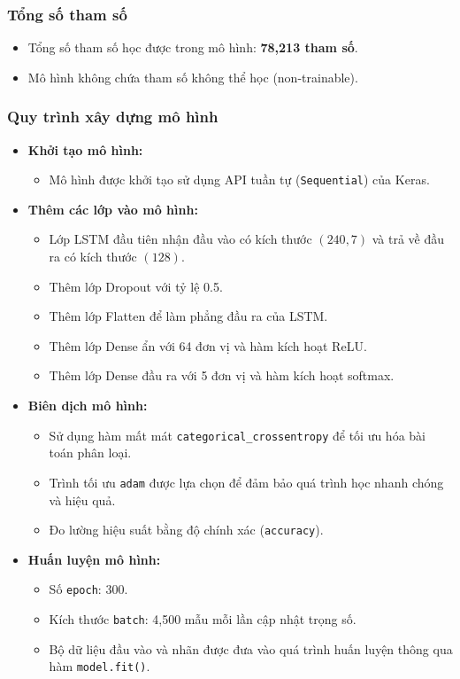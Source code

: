 \subsubsection{Tổng số tham số}

\begin{itemize}
    \item Tổng số tham số học được trong mô hình: \textbf{78,213 tham số}.
    \item Mô hình không chứa tham số không thể học (non-trainable).
\end{itemize}

\subsubsection{Quy trình xây dựng mô hình}

\begin{itemize}
    \item \textbf{Khởi tạo mô hình:}
    \begin{itemize}
        \item Mô hình được khởi tạo sử dụng API tuần tự (\texttt{Sequential}) của Keras.
    \end{itemize}

    \item \textbf{Thêm các lớp vào mô hình:}
    \begin{itemize}
        \item Lớp LSTM đầu tiên nhận đầu vào có kích thước $(240, 7)$ và trả về đầu ra có kích thước $(128)$.
        \item Thêm lớp Dropout với tỷ lệ 0.5.
        \item Thêm lớp Flatten để làm phẳng đầu ra của LSTM.
        \item Thêm lớp Dense ẩn với 64 đơn vị và hàm kích hoạt ReLU.
        \item Thêm lớp Dense đầu ra với 5 đơn vị và hàm kích hoạt softmax.
    \end{itemize}

    \item \textbf{Biên dịch mô hình:}
    \begin{itemize}
        \item Sử dụng hàm mất mát \texttt{categorical\_crossentropy} để tối ưu hóa bài toán phân loại.
        \item Trình tối ưu \texttt{adam} được lựa chọn để đảm bảo quá trình học nhanh chóng và hiệu quả.
        \item Đo lường hiệu suất bằng độ chính xác (\texttt{accuracy}).
    \end{itemize}

    \item \textbf{Huấn luyện mô hình:}
    \begin{itemize}
        \item Số \texttt{epoch}: 300.
        \item Kích thước \texttt{batch}: 4,500 mẫu mỗi lần cập nhật trọng số.
        \item Bộ dữ liệu đầu vào và nhãn được đưa vào quá trình huấn luyện thông qua hàm \texttt{model.fit()}.
    \end{itemize}
\end{itemize}

